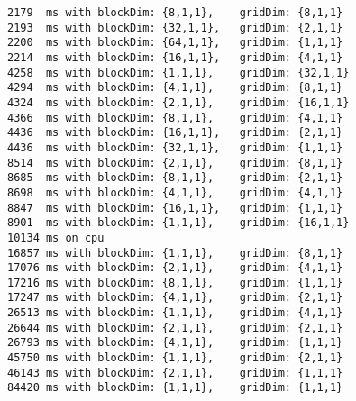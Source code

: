 \begin{lstlisting}
2179  ms with blockDim: {8,1,1},    gridDim: {8,1,1}
2193  ms with blockDim: {32,1,1},   gridDim: {2,1,1}
2200  ms with blockDim: {64,1,1},   gridDim: {1,1,1}
2214  ms with blockDim: {16,1,1},   gridDim: {4,1,1}
4258  ms with blockDim: {1,1,1},    gridDim: {32,1,1}
4294  ms with blockDim: {4,1,1},    gridDim: {8,1,1}
4324  ms with blockDim: {2,1,1},    gridDim: {16,1,1}
4366  ms with blockDim: {8,1,1},    gridDim: {4,1,1}
4436  ms with blockDim: {16,1,1},   gridDim: {2,1,1}
4436  ms with blockDim: {32,1,1},   gridDim: {1,1,1}
8514  ms with blockDim: {2,1,1},    gridDim: {8,1,1}
8685  ms with blockDim: {8,1,1},    gridDim: {2,1,1}
8698  ms with blockDim: {4,1,1},    gridDim: {4,1,1}
8847  ms with blockDim: {16,1,1},   gridDim: {1,1,1}
8901  ms with blockDim: {1,1,1},    gridDim: {16,1,1}
10134 ms on cpu
16857 ms with blockDim: {1,1,1},    gridDim: {8,1,1}
17076 ms with blockDim: {2,1,1},    gridDim: {4,1,1}
17216 ms with blockDim: {8,1,1},    gridDim: {1,1,1}
17247 ms with blockDim: {4,1,1},    gridDim: {2,1,1}
26513 ms with blockDim: {1,1,1},    gridDim: {4,1,1}
26644 ms with blockDim: {2,1,1},    gridDim: {2,1,1}
26793 ms with blockDim: {4,1,1},    gridDim: {1,1,1}
45750 ms with blockDim: {1,1,1},    gridDim: {2,1,1}
46143 ms with blockDim: {2,1,1},    gridDim: {1,1,1}
84420 ms with blockDim: {1,1,1},    gridDim: {1,1,1}
\end{lstlisting}
